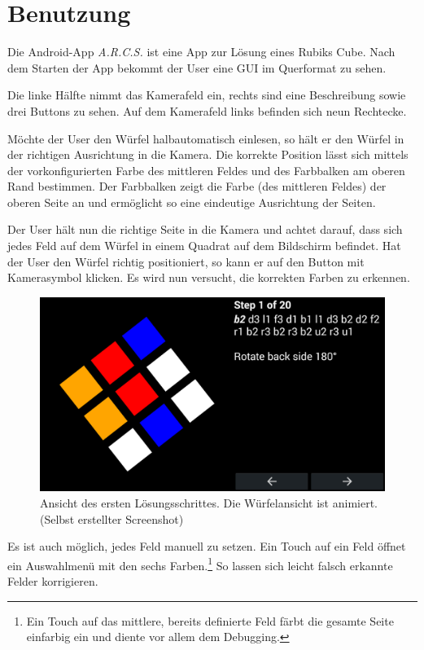 \section{Benutzung}  %

Die Android-App \emph{A.R.C.S.} ist eine App zur Lösung eines Rubiks Cube.
Nach dem Starten der App bekommt der User eine GUI im Querformat zu sehen.

Die linke Hälfte nimmt das Kamerafeld ein, rechts sind eine Beschreibung sowie
drei Buttons zu sehen. Auf dem Kamerafeld links befinden sich neun Rechtecke.

Möchte der User den Würfel halbautomatisch einlesen, so hält er den Würfel in
der richtigen Ausrichtung in die Kamera. Die korrekte Position lässt sich
mittels der vorkonfigurierten Farbe des mittleren Feldes und des Farbbalken am
oberen Rand bestimmen. Der Farbbalken zeigt die Farbe (des mittleren
Feldes) der oberen Seite an und ermöglicht so eine eindeutige Ausrichtung der
Seiten.

Der User hält nun die richtige Seite in die Kamera und achtet darauf, dass sich
jedes Feld auf dem Würfel in einem Quadrat auf dem Bildschirm befindet. Hat der
User den Würfel richtig positioniert, so kann er auf den Button mit Kamerasymbol
klicken. Es wird nun versucht, die korrekten Farben zu erkennen. 

\begin{figure}[ht!]
  \centering
  \includegraphics[width=\textwidth]{pics/arcs_solving.png}
  \caption{Ansicht des ersten Lösungsschrittes. Die Würfelansicht ist animiert.
  (Selbst erstellter Screenshot)}
  \label{fig:arcs_solving}
\end{figure}

Es ist auch möglich, jedes Feld manuell zu setzen. Ein Touch auf ein Feld öffnet
ein Auswahlmenü mit den sechs Farben.\footnote{Ein Touch auf das mittlere, bereits
definierte Feld färbt die gesamte Seite einfarbig ein und diente vor allem dem
Debugging.} So lassen sich leicht falsch erkannte Felder korrigieren.

